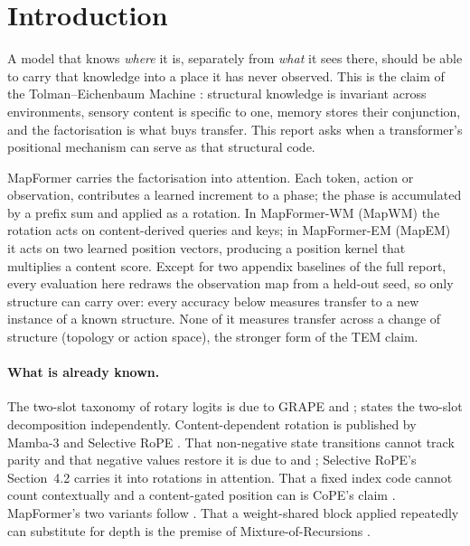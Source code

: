 \documentclass[10pt]{article}
\begin{document}
\section{Introduction}
\label{sec:intro}

A model that knows \emph{where} it is, separately from \emph{what} it sees there, should be able to carry that
knowledge into a place it has never observed. This is the claim of the Tolman--Eichenbaum Machine
\citep{whittington2020tem}: structural knowledge is invariant across environments, sensory content is specific to
one, memory stores their conjunction, and the factorisation is what buys transfer. This report asks when a
transformer's positional mechanism can serve as that structural code.

MapFormer \citep{rambaud2025mapformer} carries the factorisation into attention. Each token, action or
observation, contributes a learned increment to a phase; the phase is accumulated by a prefix sum and applied as
a rotation. In MapFormer-WM (MapWM) the rotation acts on content-derived queries and keys; in MapFormer-EM (MapEM)
it acts on two learned position vectors, producing a position kernel that multiplies a content score. Except for
two appendix baselines of the full report, every evaluation here redraws the observation map from a held-out
seed, so only structure can carry over: every accuracy below measures transfer to a new instance of a known
structure. None of it measures transfer across a change of structure (topology or action space), the stronger
form of the TEM claim.

\paragraph{What is already known.} The two-slot taxonomy of rotary logits is due to GRAPE
\citep{zhang2026grape} and \citet{puranik2026group}; \citet{vetcha2026infinite} states the two-slot decomposition
independently. Content-dependent rotation is published by Mamba-3 \citep{lahoti2026mamba3} and Selective RoPE
\citep{movahedi2026srope}. That non-negative state transitions cannot track parity and that negative values
restore it is due to \citet{sarrof2024expressive} and \citet{grazzi2025unlocking}; Selective RoPE's Section~4.2
carries it into rotations in attention. That a fixed index code cannot count contextually and a content-gated
position can is CoPE's claim \citep{golovneva2024cope}. MapFormer's two variants follow
\citet{whittington2025tale}. That a weight-shared block applied repeatedly can substitute for depth is the
premise of Mixture-of-Recursions \citep{bae2025mor}.
\end{document}
